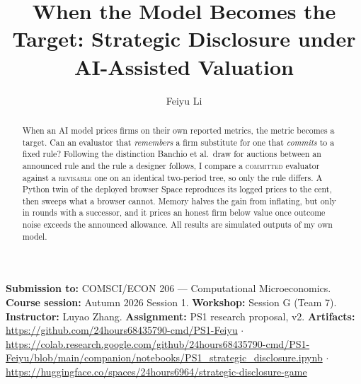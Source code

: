 \documentclass[sigconf,nonacm]{acmart}
\title{When the Model Becomes the Target: Strategic Disclosure under AI-Assisted Valuation}
\author{Feiyu Li}
\affiliation{\institution{Duke Kunshan University}\city{Kunshan}\country{China}}
\newcommand{\WorkshopSession}{Session G (Team 7)}
\newcommand{\CourseNumber}{COMSCI/ECON 206}
\newcommand{\CourseName}{Computational Microeconomics}
\newcommand{\CourseSession}{Autumn 2026 Session 1}
\newcommand{\Instructor}{Luyao Zhang}
\newcommand{\GitHubLink}{https://github.com/24hours68435790-cmd/PS1-Feiyu}
\newcommand{\ColabLink}{https://colab.research.google.com/github/24hours68435790-cmd/PS1-Feiyu/blob/main/companion/notebooks/PS1\_strategic\_disclosure.ipynb}
\newcommand{\DemoLink}{https://huggingface.co/spaces/24hours6964/strategic-disclosure-game}
\newcommand{\coursemeta}{\noindent\footnotesize\textbf{Submission to:} \CourseNumber{} --- \CourseName.
\textbf{Course session:} \CourseSession. \textbf{Workshop:} \WorkshopSession.
\textbf{Instructor:} \Instructor. \textbf{Assignment:} PS1 research proposal, v2.
\textbf{Artifacts:} \url{\GitHubLink} $\cdot$ \url{\ColabLink} $\cdot$ \url{\DemoLink}\par\smallskip}
\begin{document}
\begin{abstract}
When an AI model prices firms on their own reported metrics, the metric becomes
a target. Can an evaluator that \emph{remembers} a firm substitute for one that
\emph{commits} to a fixed rule? Following the distinction Banchio et al.\ draw
for auctions between an announced rule and the rule a designer follows, I compare
a \textsc{committed} evaluator against a \textsc{revisable} one on an identical
two-period tree, so only the rule differs. A Python twin of the deployed browser
Space reproduces its logged prices to the cent, then sweeps what a browser
cannot. Memory halves the gain from inflating, but only in rounds with a
successor, and it prices an honest firm below value once outcome noise exceeds
the announced allowance. All results are simulated outputs of my own model.
\end{abstract}


\begin{teaserfigure}
\centering
\resizebox{\textwidth}{!}{}
\caption{A firm privately knowing $\theta$ and cost type $k$ picks effort $a$
and window-dressing $m$; the evaluator either \textsc{commits} to the announced
$\bar m$ or \textsc{revises} to $\bar m+\lambda g_{t-1}$ from this firm's own
history---the wedge Banchio et al.\ identify in auctions~\cite{banchio2025}.
Section~3 switches only that box. Simulated.}
\label{fig:teaser}
\end{teaserfigure}

\maketitle\raggedbottom\coursemeta



\end{document}
